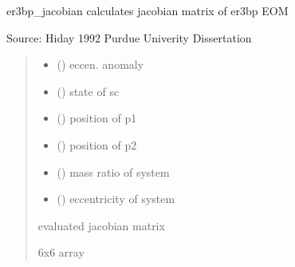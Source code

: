 \documentclass[letterpaper,10pt,english]{sphinxmanual}
\begin{document}
\begin{fulllineitems}
\label{\detokenize{models:pyraa.models.er3bp_jacobian}}
\pysigstartsignatures
{}
\pysigstopsignatures
\sphinxAtStartPar
er3bp\_jacobian \sphinxhyphen{} calculates jacobian matrix of er3bp EOM

\sphinxAtStartPar
Source: Hiday 1992 Purdue Univerity Dissertation
\begin{quote}\begin{description}
\begin{itemize}
\item {} 
\sphinxAtStartPar
{} () \sphinxhyphen{}\sphinxhyphen{} eccen. anomaly

\item {} 
\sphinxAtStartPar
{} () \sphinxhyphen{}\sphinxhyphen{} state of sc

\item {} 
\sphinxAtStartPar
{} () \sphinxhyphen{}\sphinxhyphen{} position of p1

\item {} 
\sphinxAtStartPar
{} () \sphinxhyphen{}\sphinxhyphen{} position of p2

\item {} 
\sphinxAtStartPar
{} () \sphinxhyphen{}\sphinxhyphen{} mass ratio of system

\item {} 
\sphinxAtStartPar
{} () \sphinxhyphen{}\sphinxhyphen{} eccentricity of system

\end{itemize}

\sphinxAtStartPar
{} \sphinxhyphen{}\sphinxhyphen{} evaluated jacobian matrix

\sphinxAtStartPar
6x6 array

\end{description}\end{quote}

\end{fulllineitems}
\end{document}
